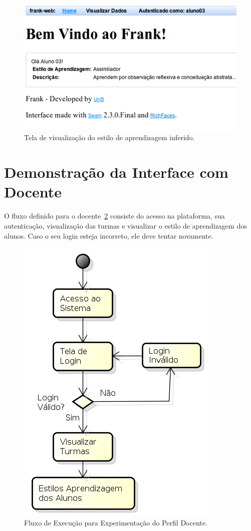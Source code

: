 \begin{figure}
	\centering
	\includegraphics[scale=0.6]{images/frank-tela-aluno-inferencia-estilo.png}
	\caption{Tela de visualização do estilo de aprendizagem inferido.}
	\label{fig:frank-tela-aluno-inferencia-estilo}
\end{figure}

\section{Demonstração da Interface com Docente}\label{section:interface-docente}
O fluxo definido para o docente~\ref{fig:fluxo-aluno} consiste do acesso na plataforma, sua autenticação, visualização das turmas e visualizar o estilo de aprendizagem dos alunos. Caso o seu login esteja incorreto, ele deve tentar novamente.

\begin{figure}
	\centering
	\includegraphics[scale=0.6]{images/fluxo-docente.png}
	\caption{Fluxo de Execução para Experimentação do Perfil Docente.}
	\label{fig:fluxo-aluno}
\end{figure}

